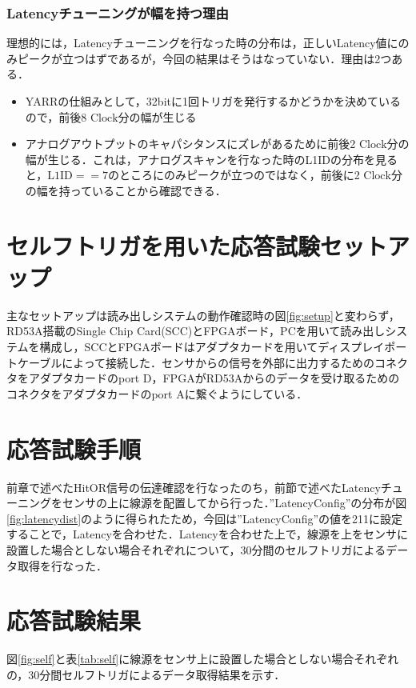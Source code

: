 \subsubsection{Latencyチューニングが幅を持つ理由}
理想的には，Latencyチューニングを行なった時の分布は，正しいLatency値にのみピークが立つはずであるが，今回の結果はそうはなっていない．理由は2つある．
\begin{itemize}
\item YARRの仕組みとして，32bitに1回トリガを発行するかどうかを決めているので，前後8 $\mathrm{Clock}$分の幅が生じる
\item アナログアウトプットのキャパシタンスにズレがあるために前後2 $\mathrm{Clock}$分の幅が生じる．これは，アナログスキャンを行なった時のL1IDの分布を見ると，$\mathrm{L1ID} == 7$のところにのみピークが立つのではなく，前後に2 $\mathrm{Clock}$分の幅を持っていることから確認できる．
\end{itemize}

\section{セルフトリガを用いた応答試験セットアップ}
\label{sec:selfsetup}
主なセットアップは読み出しシステムの動作確認時の図\ref{fig:setup}と変わらず，RD53A搭載のSingle Chip Card(SCC)とFPGAボード，PCを用いて読み出しシステムを構成し，SCCとFPGAボードはアダプタカードを用いてディスプレイポートケーブルによって接続した．センサからの信号を外部に出力するためのコネクタをアダプタカードのport D，FPGAがRD53Aからのデータを受け取るためのコネクタをアダプタカードのport Aに繋ぐようにしている．

\section{応答試験手順}
\label{sec:selfhow}
前章で述べたHitOR信号の伝達確認を行なったのち，前節で述べたLatencyチューニングをセンサの上に線源を配置してから行った．''LatencyConfig''の分布が図\ref{fig:latencydist}のように得られたため，今回は''LatencyConfig''の値を211に設定することで，Latencyを合わせた．Latencyを合わせた上で，線源を上をセンサに設置した場合としない場合それぞれについて，30分間のセルフトリガによるデータ取得を行なった．

\section{応答試験結果}
\label{sec:selfconc}
図\ref{fig:self}と表\ref{tab:self}に線源をセンサ上に設置した場合としない場合それぞれの，30分間セルフトリガによるデータ取得結果を示す．

